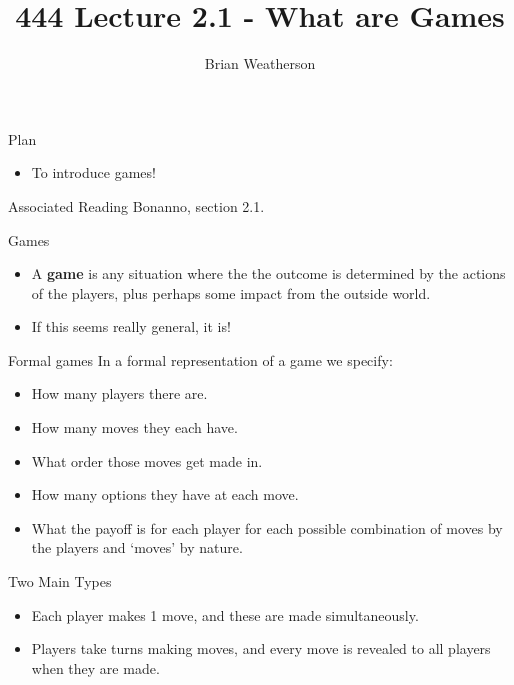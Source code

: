 \documentclass[
  ignorenonframetext,
]{beamer}
\title{444 Lecture 2.1 - What are Games}
\author{Brian Weatherson}
\date{}
\providecommand{\tightlist}{%
  \setlength{\itemsep}{0pt}\setlength{\parskip}{0pt}}
\begin{document}
\frame{\titlepage}

\begin{frame}{Plan}
\protect\hypertarget{plan}{}
\begin{itemize}
\tightlist
\item
  To introduce games!
\end{itemize}
\end{frame}

\begin{frame}{Associated Reading}
\protect\hypertarget{associated-reading}{}
Bonanno, section 2.1.
\end{frame}

\begin{frame}{Games}
\protect\hypertarget{games}{}
\begin{itemize}[<+->]
\tightlist
\item
  A \textbf{game} is any situation where the the outcome is determined
  by the actions of the players, plus perhaps some impact from the
  outside world.
\item
  If this seems really general, it is!
\end{itemize}
\end{frame}

\begin{frame}{Formal games}
\protect\hypertarget{formal-games}{}
In a formal representation of a game we specify:

\begin{itemize}[<+->]
\tightlist
\item
  How many players there are.
\item
  How many moves they each have.
\item
  What order those moves get made in.
\item
  How many options they have at each move.
\item
  What the payoff is for each player for each possible combination of
  moves by the players and `moves' by nature.
\end{itemize}
\end{frame}

\begin{frame}{Two Main Types}
\protect\hypertarget{two-main-types}{}
\begin{itemize}[<+->]
\tightlist
\item
  Each player makes 1 move, and these are made simultaneously.
\item
  Players take turns making moves, and every move is revealed to all
  players when they are made.
\end{itemize}
\end{frame}
\end{document}
